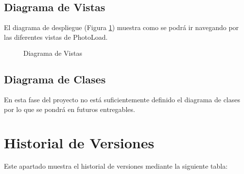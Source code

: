 \documentclass{scrartcl}
\begin{document}
\subsection{Diagrama de Vistas}\label{cap:DiagramaVistas}
El diagrama de despliegue (Figura \ref{fig:DiagramaVistas}) muestra como se podrá ir navegando por las diferentes vistas de PhotoLoad.
\begin{figure}[H]
	
	\centering
	\caption{Diagrama de Vistas}
	\label{fig:DiagramaVistas}
	
\end{figure}
\subsection{Diagrama de Clases}
En esta fase del proyecto no está suficientemente definido el diagrama de clases por lo que se pondrá en futuros entregables.
\section{Historial de Versiones}
Este apartado muestra el historial de versiones mediante la siguiente tabla:
\\
\end{document}

